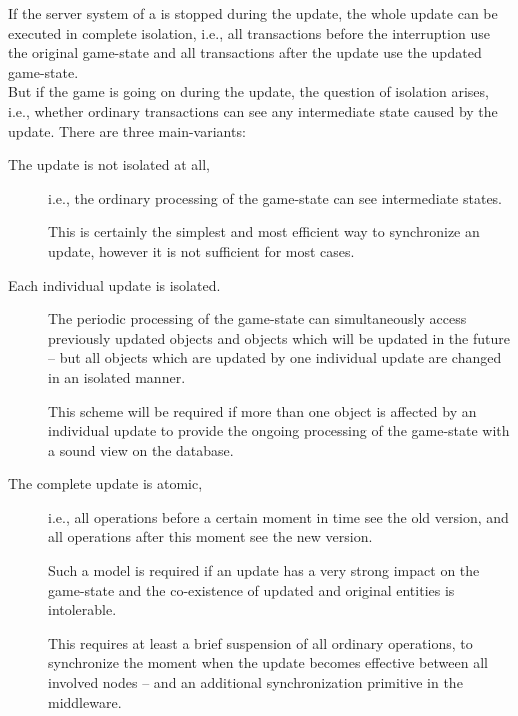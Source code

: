 \documentclass[a4paper, 10pt]{book}
\begin{document}
            If the server system of a \MMORG is stopped during the update, the
            whole update can be executed in complete isolation, i.e., all
            transactions before the interruption use the original game-state and
            all transactions after the update use the updated game-state.\\
            But if the game is going on during the update, the question of
            isolation arises, i.e., whether ordinary transactions can see any
            intermediate state caused by the update. There are three
            main-variants:
            \begin{description}
                \item[The update is not isolated at all,] i.e., the ordinary processing
                    of the game-state can see intermediate states.

                    This is certainly the simplest and most efficient way to synchronize
                    an update, however it is not sufficient for most cases. 

                \item[Each individual update is isolated.] The periodic processing of
                    the game-state can simultaneously access previously updated objects and objects
                    which will be updated in the future -- but all objects which are updated by one
                    individual update are changed in an isolated manner.

                    This scheme will be required if more than one object is affected by
                    an individual update to provide the ongoing processing of the
                    game-state with a sound view on the database. 

                \item[The complete update is atomic,] i.e., all operations before a
                    certain moment in time see the old version, and all operations
                    after this moment see the new version.

                    Such a model is required if an update has a very strong impact on
                    the game-state and the co-existence of updated and original entities
                    is intolerable.

                    This requires at least a brief suspension of all ordinary
                    operations, to synchronize the moment when the update becomes
                    effective between all involved nodes -- and an additional
                    synchronization primitive in the middleware. 
            \end{description}
\end{document}
